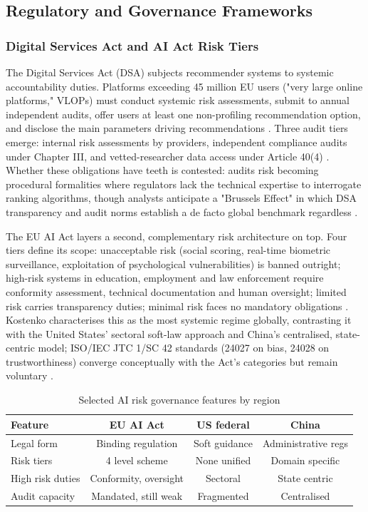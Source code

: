 \documentclass[11pt]{article}
\begin{document}
\subsection{Regulatory and Governance Frameworks}

\subsubsection{Digital Services Act and AI Act Risk Tiers}
\label{sec:dsa_ai_act_risk_tiers} The Digital Services Act (DSA) subjects recommender systems to systemic accountability duties. Platforms exceeding 45 million EU users ("very large online platforms," VLOPs) must conduct systemic risk assessments, submit to annual independent audits, offer users at least one non-profiling recommendation option, and disclose the main parameters driving recommendations \parencites[7]{1456534}[12]{6502223}. Three audit tiers emerge: internal risk assessments by providers, independent compliance audits under Chapter III, and vetted-researcher data access under Article 40(4) \parencites[18]{3195574}[19]{3195574}. Whether these obligations have teeth is contested: audits risk becoming procedural formalities where regulators \parencites[9]{7461574}[9]{1456534} lack the technical expertise to interrogate ranking algorithms, though analysts anticipate a "Brussels Effect" in which DSA transparency and audit norms establish a de facto global benchmark regardless \parencites[8]{1456534}[7]{5162643}.

The EU AI Act layers a second, complementary risk architecture on top. Four tiers define its scope: unacceptable risk (social scoring, real-time biometric surveillance, exploitation of psychological vulnerabilities) is banned outright; high-risk systems in education, employment and law enforcement require conformity assessment, technical documentation and human oversight; limited risk carries transparency duties; minimal risk faces no mandatory obligations \parencites[10]{2977039}[12]{6502223}. Kostenko characterises this as the most systemic regime globally, contrasting it with the United States' sectoral soft-law approach and China's centralised, state-centric model; ISO/IEC JTC 1/SC 42 standards (24027 on bias, 24028 on trustworthiness) converge conceptually with the Act's categories but remain voluntary \parencites[4]{8589961}[5]{8589961}.

\begin{table}[H] \centering \caption{Selected AI risk governance features by region} \begin{tabular}{lccc} \hline Feature & EU AI Act & US federal & China \\ \hline Legal form & Binding regulation & Soft guidance & Administrative regs \\ Risk tiers & 4 level scheme & None unified & Domain specific \\ High risk duties & Conformity, oversight & Sectoral & State centric \\ Audit capacity & Mandated, still weak & Fragmented & Centralised \\ \hline \end{tabular} \end{table}
\end{document}
